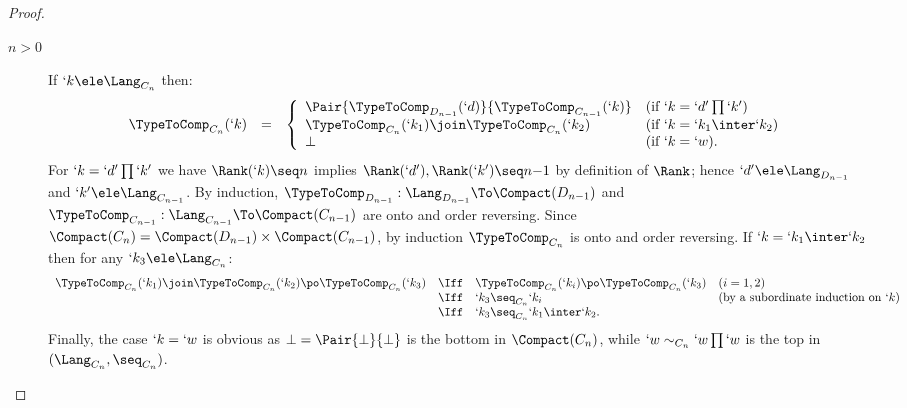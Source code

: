 \documentclass{CSML}
\begin{document}
\begin{proof}
\begin{description}
 \item[$n>0$]
If $`k \ele \Lang_{C_n}$ then:
%
 \[ \begin{array}{rcl}
 \TypeToComp_{C_n}(`k) 
	&=& 
\left \{
 \begin{array}{ll}
	\Pair{\TypeToComp_{D_{n{-}1}}(`d) }{ \TypeToComp_{C_{n{-}1}}(`k)} & (\textrm{if }`k = `d'\prod `k') \\
	\TypeToComp_{C_n}(`k_1)\join \TypeToComp_{C_n}(`k_2) & (\textrm{if }`k = `k_1\inter`k_2) \\
	\bot & (\textrm{if }`k = `w).
 \end{array} \right.
 \end{array} \]
For $`k = `d'\prod `k'$ we have $\Rank(`k) \seq n$ implies $\Rank(`d'),\Rank(`k') \seq n{-}1$ by definition of $\Rank$; hence 
$`d' \ele \Lang_{D_{n{-}1}}$ and $`k' \ele \Lang_{C_{n{-}1}}$. 
By induction, $\TypeToComp_{D_{n{-}1}}: \Lang_{D_{n{-}1}} \To \Compact(D_{n{-}1})$ and
$\TypeToComp_{C_{n{-}1}}: \Lang_{C_{n{-}1}} \To \Compact(C_{n{-}1})$ are onto and order reversing. 
Since $\Compact(C_n) = \Compact(D_{n{-}1}) \times \Compact(C_{n{-}1})$, 
by induction $\TypeToComp_{C_n}$ is onto and order reversing. 
If $`k = `k_1\inter`k_2$ then for any $`k_3 \ele \Lang_{C_n}$:
%
 \[ \begin{array}{rcl@{\quad}l}
\TypeToComp_{C_n}(`k_1)\join \TypeToComp_{C_n}(`k_2) \po \TypeToComp_{C_n}(`k_3) 
& \Iff & \TypeToComp_{C_n}(`k_i) \po \TypeToComp_{C_n}(`k_3) & (i =1,2) \\ 
& \Iff & `k_3 \seq_{C_{n}} `k_i & (\textrm{by a subordinate induction on $`k$}) \\
& \Iff & `k_3 \seq_{C_{n}} `k_1\inter `k_2.
 \end{array} \]
Finally, the case $`k = `w$ is obvious as $\bot = \Pair{\bot }{ \bot}$ is the bottom in $\Compact(C_n)$, while $`w \sim_{C_n} `w\prod `w$ is the top
in $(\Lang_{C_n}, \seq_{C_{n}})$.


\end{description}
\end{proof}
\end{document}
